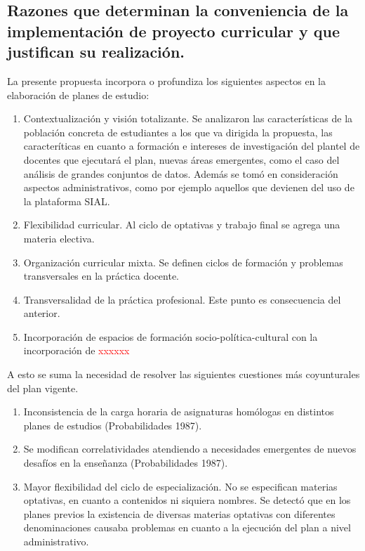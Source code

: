 \documentclass[a4paper, 12pt]{article}
\begin{document}
\subsection{Razones que determinan la conveniencia de la implementación de proyecto curricular  y que justifican su realización.}

La presente propuesta incorpora o profundiza los siguientes aspectos en la elaboración de planes de estudio: 

\begin{enumerate}
\item Contextualización y visión totalizante. Se analizaron las características de la población concreta de estudiantes a los que va dirigida la propuesta, las caracteríticas en cuanto a formación e intereses de investigación del plantel de docentes que ejecutará el plan, nuevas áreas emergentes, como el caso del análisis de grandes conjuntos de datos. Además se tomó en consideración aspectos administrativos, como por ejemplo aquellos que devienen del uso de la plataforma SIAL. 
\item Flexibilidad curricular. Al ciclo de optativas y trabajo final se agrega una materia electiva.
\item Organización curricular mixta. Se definen ciclos de formación y problemas transversales en la práctica docente. 
\item Transversalidad de la práctica profesional. Este punto es consecuencia del anterior.
\item Incorporación de espacios de formación socio-política-cultural con la incorporación de \textcolor{red}{xxxxxx}
\end{enumerate}

A esto se suma la necesidad de resolver las siguientes cuestiones más coyunturales del plan vigente.

\begin{enumerate}
\item Inconsistencia de la carga horaria de asignaturas homólogas en distintos planes de estudios (Probabilidades 1987).

\item Se modifican correlatividades atendiendo a necesidades emergentes de nuevos desafíos en la enseñanza (Probabilidades 1987). 

\item Mayor flexibilidad del ciclo de especialización. No se especifican materias optativas, en cuanto a contenidos ni siquiera nombres. Se detectó que en los planes previos la existencia de diversas materias optativas con diferentes denominaciones causaba problemas en cuanto a la ejecución del plan a nivel administrativo.  
\end{enumerate}
\end{document}
